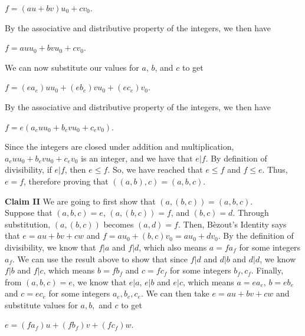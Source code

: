 \documentclass[12pt]{article}
\newenvironment{problem}[2][Problem]{\begin{trivlist}
\item[\hskip \labelsep {\bfseries #1}\hskip \labelsep {\bfseries #2.}]}{\end{trivlist}}
\begin{document}
\begin{problem}{2}
\begin{center}
$f=(au+bv)u_0+cv_0$.
\end{center}

\noindent
By the associative and distributive property of the integers, we then have 

\begin{center}
$f=auu_0+bvu_0+cv_0$.
\end{center}

\noindent
We can now substitute our values for $a$, $b$, and $c$ to get 

\begin{center}
$f=(ea_e)uu_0+(eb_e)vu_0+(ec_e)v_0$.
\end{center}

\noindent
By the associative and distributive property of the integers, we then have 

\begin{center}
$f=e(a_euu_0+b_evu_0+c_ev_0)$.
\end{center}

\noindent
Since the integers are closed under addition and multiplication, $a_euu_0+b_evu_0+c_ev_0$ is an integer, and we have that $e|f$. By definition of divisibility, if $e|f$, then $e \leq f$. So, we have reached that $e \leq f$ and $f \leq e$. Thus, $e=f$, therefore proving that $((a,b),c)=(a,b,c)$.

\vspace{.3cm}

\noindent
\textbf{Claim II} We are going to first show that $(a,(b,c))=(a,b,c)$. \\

\noindent
Suppose that $(a,b,c)=e$, $(a,(b,c))=f$, and $(b,c)=d$. Through substitution, $(a,(b,c))$ becomes $(a,d)=f$. Then, B\`ezout's Identity says that $e=au+bv+cw$ and $f=au_0+(b,c)v_0=au_0+dv_0$. By the definition of divisibility, we know that $f|a$ and $f|d$, which also means $a=fa_f$ for some integers $a_f$. We can use the result above to show that since $f|d$ and $d|b$ and $d|d$, we know $f|b$ and $f|c$, which means $b=fb_f$ and $c=fc_f$ for some integers $b_f, c_f$. Finally, from $(a,b,c)=e$, we know that $e|a$, $e|b$ and $e|c$, which means $a=ea_e$, $b=eb_e$ and $c=ec_e$ for some integers $a_e, b_e, c_e$. We can then take $e=au+bv+cw$ and substitute values for $a,b,$ and $c$ to get

\begin{center}
$e=(fa_f)u+(fb_f)v+(fc_f)w$.
\end{center}


\end{problem}
\end{document}
